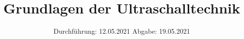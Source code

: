 

\subject{Versuch Nr.US1}
\title{Grundlagen der Ultraschalltechnik}
\date{%
  Durchführung: 12.05.2021
  \hspace{3em}
  Abgabe: 19.05.2021
}



\maketitle
\thispagestyle{empty}
\tableofcontents
\newpage 






%

\nocite{*}

\printbibliography{}


